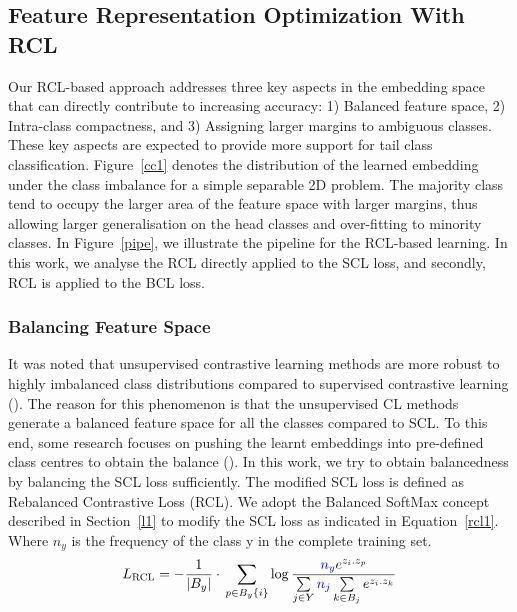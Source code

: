 \subsection{Feature Representation Optimization With RCL}
Our RCL-based approach addresses three key aspects in the embedding space that can directly contribute to increasing accuracy: 1) Balanced feature space, 2) Intra-class compactness, and 3) Assigning larger margins to ambiguous classes. These key aspects are expected to provide more support for tail class classification. Figure~\ref{cc1} denotes the distribution of the learned embedding under the class imbalance for a simple separable 2D problem. The majority class tend to occupy the larger area of the feature space with larger margins, thus allowing larger generalisation on the head classes and over-fitting to minority classes. In Figure~\ref{pipe}, we illustrate the pipeline for the RCL-based learning. In this work, we analyse the RCL directly applied to the SCL loss, and secondly, RCL is applied to the BCL loss. 
\subsubsection{Balancing Feature Space}
It was noted that unsupervised contrastive learning methods are more robust to highly imbalanced class distributions compared to supervised contrastive learning (\cite{self}). The reason for this phenomenon is that the unsupervised CL methods generate a balanced feature space for all the classes compared to SCL. To this end, some research focuses on pushing the learnt embeddings into pre-defined class centres to obtain the balance (\cite{target}). In this work, we try to obtain balancedness by balancing the  SCL loss sufficiently. The modified SCL loss is defined as Rebalanced Contrastive Loss (RCL). We adopt the Balanced SoftMax concept described in Section~\ref{l1} to modify the SCL loss as indicated in Equation~\ref{rcl1}. Where $n_y$ is the frequency of the class y in the complete training set. 
\begin{equation}
L_{\text{RCL}}=-\frac{1}{|B_y|} \cdot \\ \sum\limits_{p\in {B_y \{i\}} }\log \frac{\mathcolor{blue}{n_y}e^{z_i.z_p}}{\sum\limits_{j\in Y} \mathcolor{blue}{n_j}\sum\limits_{k \in B_j } e^{z_i.z_k}}
\label{rcl1}
\end{equation}

